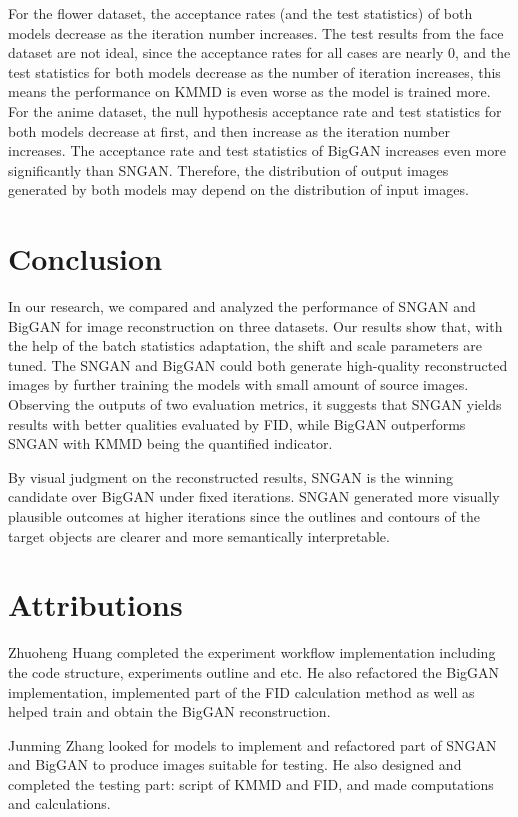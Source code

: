 \documentclass{article}
\begin{document}
For the flower dataset, the acceptance rates (and the test statistics) of both models decrease as the iteration number increases. The test results from the face dataset are not ideal, since the acceptance rates for all cases are nearly 0, and the test statistics for both models decrease as the number of iteration increases, this means the performance on KMMD is even worse as the model is trained more. For the anime dataset, the null hypothesis acceptance rate and test statistics for both models decrease at first, and then increase as the iteration number increases. The acceptance rate  and test statistics of BigGAN increases even more significantly than SNGAN. Therefore, the distribution of output images generated by both models may depend on the distribution of input images.

\section{Conclusion}
    In our research, we compared and analyzed the performance of SNGAN and BigGAN for image reconstruction on three datasets. Our results show that, with the help of the batch statistics adaptation, the shift and scale parameters are tuned. The SNGAN and BigGAN could both generate high-quality reconstructed images by further training the models with small amount of source images. Observing the outputs of two evaluation metrics, it suggests that SNGAN yields results with better qualities evaluated by FID, while BigGAN outperforms SNGAN with KMMD being the quantified indicator.
    
    By visual judgment on the reconstructed results, SNGAN is the winning candidate over BigGAN under fixed iterations. SNGAN generated more visually plausible outcomes at higher iterations since the outlines and contours of the target objects are clearer and more semantically interpretable.
    
\section{Attributions}
    Zhuoheng Huang completed the experiment workflow implementation including the code structure, experiments outline and etc. He also refactored the BigGAN implementation, implemented part of the FID calculation method as well as helped train and obtain the BigGAN reconstruction.
    
    Junming Zhang looked for models to implement and refactored part of SNGAN and BigGAN to produce images suitable for testing. He also designed and completed the testing part: script of KMMD and FID, and made computations and calculations.
    
\end{document}
